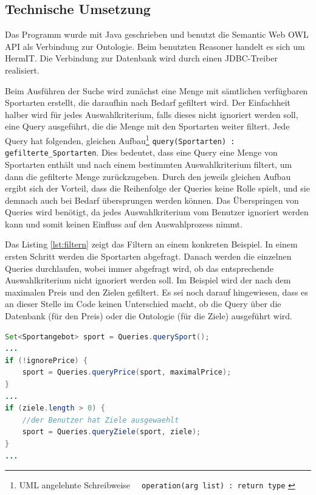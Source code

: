 \subsection{Technische Umsetzung}
Das Programm wurde mit Java geschrieben und benutzt die Semantic Web OWL API \autocite{semweb:owlapi} als Verbindung zur Ontologie. Beim benutzten Reasoner handelt es sich um HermIT\autocite{krr:hermit}. Die Verbindung zur Datenbank wird durch einen JDBC-Treiber\autocite{oracle:jdbc} realisiert.

Beim Ausf\"uhren der Suche wird zun\"achst eine Menge mit s\"amtlichen verf\"ugbaren Sportarten erstellt, die daraufhin nach Bedarf gefiltert wird. Der Einfachheit halber wird f\"ur jedes Auswahlkriterium, falls dieses nicht ignoriert werden soll, eine Query ausgef\"uhrt, die die Menge mit den Sportarten weiter filtert. Jede Query hat folgenden, gleichen Aufbau\footnote{UML angelehnte Schreibweise \lstinline"  operation(arg list) : return type" \autocite{kow:umlclass}} \lstinline"query(Sportarten) : gefilterte_Sportarten". Dies bedeutet, dass eine Query eine Menge von Sportarten enth\"alt und nach einem bestimmten Auswahlkriterium filtert, um dann die gefilterte Menge zur\"uckzugeben. Durch den jeweils gleichen Aufbau ergibt sich der Vorteil, dass die Reihenfolge der Queries keine Rolle spielt, und sie demnach auch bei Bedarf \"ubersprungen werden k\"onnen. Das \"Uberspringen von Queries wird ben\"otigt, da jedes Auswahlkriterium vom Benutzer ignoriert werden kann und somit keinen Einfluss auf den Auswahlprozess nimmt.

Das Listing \ref{lst:filtern} zeigt das Filtern an einem konkreten Beispiel. In einem ersten Schritt werden die Sportarten abgefragt. Danach werden die einzelnen Queries durchlaufen, wobei immer abgefragt wird, ob das entsprechende Auswahlkriterium nicht ignoriert werden soll. Im Beispiel wird der nach dem maximalen Preis und den Zielen gefiltert. Es sei noch darauf hingewiesen, dass es an dieser Stelle im Code keinen Unterschied macht, ob die Query \"uber die Datenbank (f\"ur den Preis) oder die Ontologie (f\"ur die Ziele) ausgef\"uhrt wird. 

\begin{lstlisting}[float=htbp, caption=Filtern von Sportarten, label=lst:filtern, language=JAVA]
Set<Sportangebot> sport = Queries.querySport();
...        
if (!ignorePrice) {
	sport = Queries.queryPrice(sport, maximalPrice);
}
...
if (ziele.length > 0) {
	//der Benutzer hat Ziele ausgewaehlt
	sport = Queries.queryZiele(sport, ziele);
}
...                
\end{lstlisting}

